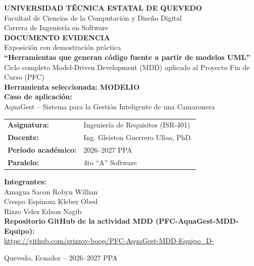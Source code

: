 \documentclass[11pt,a4paper]{article}
\title{}
\date{}
\begin{document}
\begin{titlepage}
\centering
\vspace*{0.5cm}

{\Large \bfseries UNIVERSIDAD TÉCNICA ESTATAL DE QUEVEDO}\\[0.3cm]
{\large Facultad de Ciencias de la Computación y Diseño Digital}\\
{\large Carrera de Ingeniería en Software}\\[1.2cm]


\vspace{1.2cm}
{\large \bfseries DOCUMENTO EVIDENCIA}\\[0.2cm]
{\large Exposición con demostración práctica}\\[0.4cm]

{\Large \bfseries ``Herramientas que generan código fuente a partir de modelos UML''}\\[0.3cm]
{\large Ciclo completo Model-Driven Development (MDD) aplicado al Proyecto Fin de Curso (PFC)}\\[0.6cm]

{\large \bfseries Herramienta seleccionada: MODELIO}\\[1cm]

{\large \bfseries Caso de aplicación:}\\
{\large AquaGest -- Sistema para la Gestión Inteligente de una Camaronera}\\[1.2cm]

\begin{tabular}{ll}
\textbf{Asignatura:} & Ingeniería de Requisitos (ISR-401) \\
\textbf{Docente:} & Ing. Gleiston Guerrero Ulloa, PhD. \\
\textbf{Período académico:} & 2026--2027 PPA \\
\textbf{Paralelo:} & 4to ``A'' Software \\
\end{tabular}

\vspace{1cm}
{\bfseries Integrantes:}\\
Amagua Sacon Robyn Willian\\
Crespo Espinoza Kleber Obed\\
Rizzo Velez Edson Nagib\\


\vspace{0.6cm}
{\bfseries Repositorio GitHub de la actividad MDD (PFC-AquaGest-MDD-Equipo):}\\
\vspace{1.0cm}
\sloppy \url{https://github.com/erizzov-boop/PFC-AquaGest-MDD-Equipo_D-}

\vfill
{\large Quevedo, Ecuador -- 2026--2027 PPA}
\end{titlepage}
\end{document}
